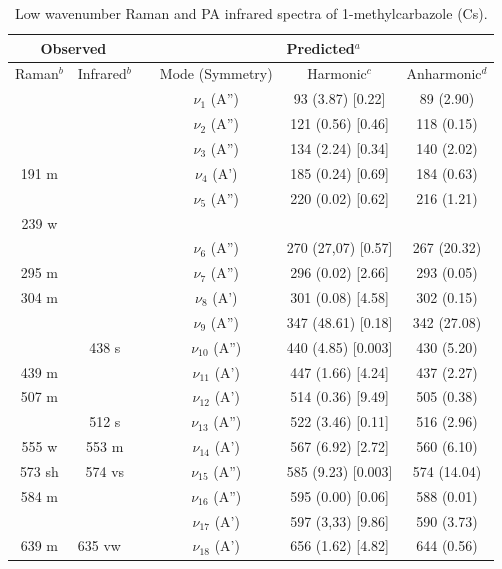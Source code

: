 	
	
	\begin{table}[H]
		\caption{Low wavenumber Raman and PA infrared spectra of 1-methylcarbazole (Cs).}
		\begin{center}
				\begin{threeparttable}
			\begin{tabular}{c c c c c c}
				\hline
				\multicolumn{ 2}{c}{Observed} & \multicolumn{1}{c}{} & \multicolumn{ 3}{c}{Predicted$^{a}$} \\ \hline
				Raman$^{b}$ & \multicolumn{1}{c}{Infrared$^{b}$} &  & \multicolumn{1}{c}{Mode (Symmetry)} & \multicolumn{1}{c}{Harmonic$^{c}$} & Anharmonic$^{d}$ \\ \hline
 &  &  & $\nu_{1}$ (A”) & 93 (3.87) [0.22] & 89 (2.90) \\ 
 &  &  & $\nu_{2}$ (A”) & 121 (0.56) [0.46] & 118 (0.15) \\ 
 &  &  & $\nu_{3}$ (A”) & 134 (2.24) [0.34] & 140 (2.02) \\ 
 191 m &  &  & $\nu_{4}$ (A’)
 & 185 (0.24) [0.69] & 184 (0.63) \\ 
 &  &  & $\nu_{5}$ (A”) & 220 (0.02) [0.62] & 216 (1.21) \\ 
 239 w &  &  &  &  & \\ 
 &  &  & $\nu_{6}$ (A”) & 270 (27,07) [0.57] & 267 (20.32) \\ 
 295 m &  &  & $\nu_{7}$ (A”) & 296 (0.02) [2.66] & 293 (0.05) \\ 
 304 m &  &  & $\nu_{8}$ (A’) & 301 (0.08) [4.58] & 302 (0.15) \\ 
 &  &  & $\nu_{9}$ (A”) & 347 (48.61) [0.18] & 342 (27.08) \\ 
 & 438 s &  & $\nu_{10}$ (A”) & 440 (4.85) [0.003] & 430 (5.20) \\ 
 439 m &  &  & $\nu_{11}$ (A’) & 447 (1.66) [4.24] & 437 (2.27) \\ 
 507 m &  &  & $\nu_{12}$ (A’) & 514 (0.36) [9.49] & 505 (0.38) \\
 & 512 s &  & $\nu_{13}$ (A”) & 522 (3.46) [0.11] & 516 (2.96) \\ 
 555 w & 553 m &  &$\nu_{14}$ (A’) & 567 (6.92) [2.72] & 560 (6.10) \\ 
 573 sh & 574 vs &  & $\nu_{15}$ (A”) & 585 (9.23) [0.003] & 574 (14.04) \\ 
 584 m & \multicolumn{1}{l}{} &  & $\nu_{16}$ (A”) & 595 (0.00) [0.06] & 588 (0.01) \\ 
 & \multicolumn{1}{l}{} &  & $\nu_{17}$ (A’) & 597 (3,33) [9.86] & 590 (3.73) \\ 
 639 m & \multicolumn{1}{l}{635 vw} &  & $\nu_{18}$ (A’) & 656 (1.62) [4.82] & 644 (0.56) \\	
	\bottomrule
	

\end{tabular}
\end{threeparttable}
\end{center}
\end{table}
